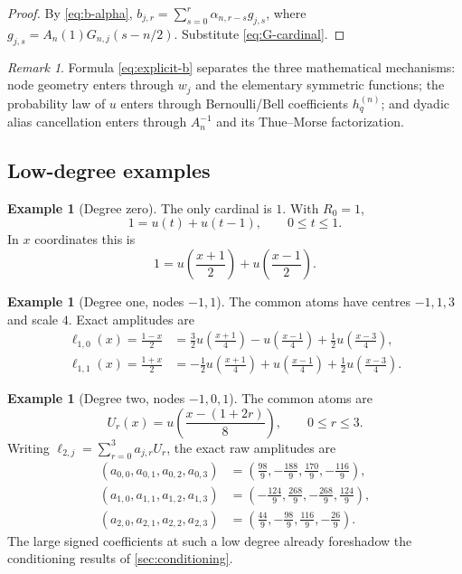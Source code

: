\documentclass[11pt,oneside]{article}
\theoremstyle{definition}
\newtheorem{example}[theorem]{Example}
\theoremstyle{remark}
\newtheorem{remark}[theorem]{Remark}
\newcommand{\1}{\mathbf{1}}
\begin{document}
\begin{proof}
By \eqref{eq:b-alpha},
$b_{j,r}=\sum_{s=0}^r\alpha_{n,r-s}g_{j,s}$, where
$g_{j,s}=A_n(1)G_{n,j}(s-n/2)$.  Substitute
\eqref{eq:G-cardinal}.
\end{proof}

\begin{remark}
Formula \eqref{eq:explicit-b} separates the three mathematical mechanisms:
node geometry enters through $w_j$ and the elementary symmetric functions;
the probability law of $u$ enters through Bernoulli/Bell coefficients
$h_q^{(n)}$; and dyadic alias cancellation enters through
$A_n^{-1}$ and its Thue--Morse factorization.
\end{remark}

\subsection{Low-degree examples}

\begin{example}[Degree zero]
The only cardinal is $1$.  With $R_0=1$,
\[
 1=u(t)+u(t-1),\qquad 0\le t\le1.
\]
In $x$ coordinates this is
\[
 1=u\!\left(\frac{x+1}{2}\right)
   +u\!\left(\frac{x-1}{2}\right).
\]
\end{example}

\begin{example}[Degree one, nodes $-1,1$]
The common atoms have centres $-1,1,3$ and scale $4$.  Exact amplitudes are
\begin{align*}
 \ell_{1,0}(x)=\frac{1-x}{2}
 &=\frac32u\!\left(\frac{x+1}{4}\right)
   -u\!\left(\frac{x-1}{4}\right)
   +\frac12u\!\left(\frac{x-3}{4}\right),\\
 \ell_{1,1}(x)=\frac{1+x}{2}
 &=-\frac12u\!\left(\frac{x+1}{4}\right)
   +u\!\left(\frac{x-1}{4}\right)
   +\frac12u\!\left(\frac{x-3}{4}\right).
\end{align*}
\end{example}

\begin{example}[Degree two, nodes $-1,0,1$]
\label{ex:quadratic}
The common atoms are
\[
 U_r(x)=u\!\left(\frac{x-(1+2r)}8\right),\qquad 0\le r\le3.
\]
Writing $\ell_{2,j}=\sum_{r=0}^3a_{j,r}U_r$, the exact raw amplitudes are
\begin{align*}
(a_{0,0},a_{0,1},a_{0,2},a_{0,3})&=
 \left(\frac{98}{9},-\frac{188}{9},\frac{170}{9},-\frac{116}{9}\right),\\
(a_{1,0},a_{1,1},a_{1,2},a_{1,3})&=
 \left(-\frac{124}{9},\frac{268}{9},-\frac{268}{9},\frac{124}{9}\right),\\
(a_{2,0},a_{2,1},a_{2,2},a_{2,3})&=
 \left(\frac{44}{9},-\frac{98}{9},\frac{116}{9},-\frac{26}{9}\right).
\end{align*}
The large signed coefficients at such a low degree already foreshadow the
conditioning results of \cref{sec:conditioning}.
\end{example}
\end{document}
